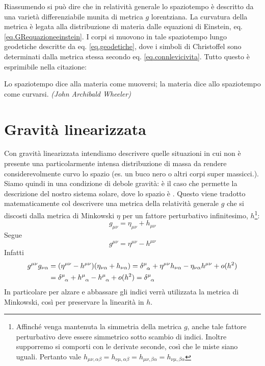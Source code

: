Riassumendo si può dire che in relatività generale lo spaziotempo è descritto da una varietà differenziabile munita di metrica $g$ lorentziana. La curvatura della metrica è legata alla distribuzione di materia dalle equazioni di Einstein, eq. \ref{eq.GRequazioneeinstein}. I corpi si muovono in tale spaziotempo lungo geodetiche descritte da eq. \ref{eq.geodetiche}, dove i simboli di Christoffel sono determinati dalla metrica stessa secondo eq. \ref{eq.connlevicivita}. Tutto questo è esprimibile nella citazione:

\begin{displayquote}
    Lo spaziotempo dice alla materia come muoversi; la materia dice allo spaziotempo come curvarsi.
    \textit{(John Archibald Wheeler)}
\end{displayquote}


\section{Gravità linearizzata}\label{para.gravlineare}
Con gravità linearizzata intendiamo descrivere quelle situazioni in cui non è presente una particolarmente intensa distribuzione di massa da rendere considerevolmente curvo lo spazio (es. un buco nero o altri corpi super massicci.). Siamo quindi in una condizione di debole gravità: è il caso che permette la descrizione del nostro sistema solare, dove lo spazio è . Questo viene tradotto matematicamente col descrivere una metrica della relatività generale $g$ che si discosti dalla metrica di Minkowski $\eta$ per un fattore perturbativo infinitesimo, $h$\footnote{Affinché venga mantenuta la simmetria della metrica $g$, anche tale fattore perturbativo deve essere simmetrico sotto scambio di indici. Inoltre supporremo si comporti  con le derivate seconde, così che le miste siano uguali. Pertanto vale $h_{\mu\nu,\alpha\beta}=h_{\nu\mu,\alpha\beta}=h_{\mu\nu,\beta\alpha}=h_{\nu\mu,\beta\alpha}$}:
\begin{equation}
    g_{\mu\nu} = \eta_{\mu\nu} + h_{\mu\nu}
    \label{eq.metricalineare}
\end{equation}
Segue
\begin{equation*}
    g^{\mu\nu}= \eta^{\mu\nu} -h^{\mu\nu}
\end{equation*}
Infatti
\begin{align*}
    g^{\mu\nu}g_{\nu\alpha} &= (\eta^{\mu\nu} - h^{\mu\nu})(\eta_{\nu\alpha} +h_{\nu\alpha}) =\tensor{\delta}{^\mu_\alpha} + \eta^{\mu\nu}h_{\nu\alpha} -\eta_{\nu\alpha}h^{\mu\nu} + o(h^2) \\
    &= \tensor{\delta}{^\mu_\alpha} + \tensor{h}{^\mu_\alpha} - \tensor{h}{^\mu_\alpha} +o(h^2) = \tensor{\delta}{^\mu_\alpha}
\end{align*}
In particolare per alzare e abbassare gli indici verrà utilizzata la metrica di Minkowski, così per preservare la linearità in $h$.

